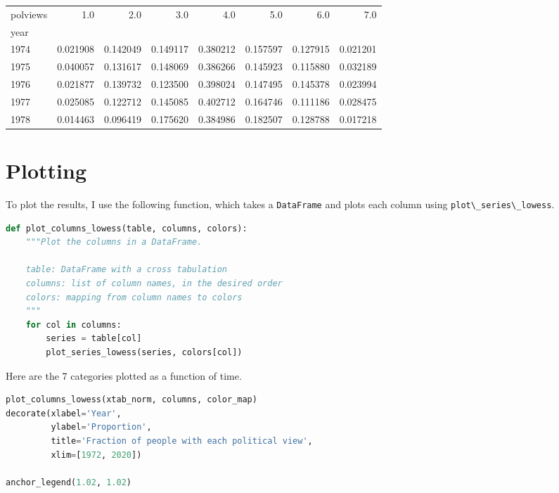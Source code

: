 \begin{tabular}{lrrrrrrr}
\toprule
polviews &       1.0 &       2.0 &       3.0 &       4.0 &       5.0 &       6.0 &       7.0 \\
year &           &           &           &           &           &           &           \\
\midrule
1974 &  0.021908 &  0.142049 &  0.149117 &  0.380212 &  0.157597 &  0.127915 &  0.021201 \\
1975 &  0.040057 &  0.131617 &  0.148069 &  0.386266 &  0.145923 &  0.115880 &  0.032189 \\
1976 &  0.021877 &  0.139732 &  0.123500 &  0.398024 &  0.147495 &  0.145378 &  0.023994 \\
1977 &  0.025085 &  0.122712 &  0.145085 &  0.402712 &  0.164746 &  0.111186 &  0.028475 \\
1978 &  0.014463 &  0.096419 &  0.175620 &  0.384986 &  0.182507 &  0.128788 &  0.017218 \\
\bottomrule
\end{tabular}

\hypertarget{plotting}{%
\section{Plotting}\label{plotting}}

To plot the results, I use the following function, which takes a
\passthrough{\lstinline!DataFrame!} and plots each column using
\passthrough{\lstinline!plot\_series\_lowess!}.

\begin{lstlisting}[language=Python,style=source]
def plot_columns_lowess(table, columns, colors):
    """Plot the columns in a DataFrame.
    
    table: DataFrame with a cross tabulation
    columns: list of column names, in the desired order
    colors: mapping from column names to colors
    """
    for col in columns:
        series = table[col]
        plot_series_lowess(series, colors[col])
\end{lstlisting}

Here are the 7 categories plotted as a function of time.

\begin{lstlisting}[language=Python,style=source]
plot_columns_lowess(xtab_norm, columns, color_map)
decorate(xlabel='Year',
         ylabel='Proportion',
         title='Fraction of people with each political view',
         xlim=[1972, 2020])

anchor_legend(1.02, 1.02)
\end{lstlisting}

